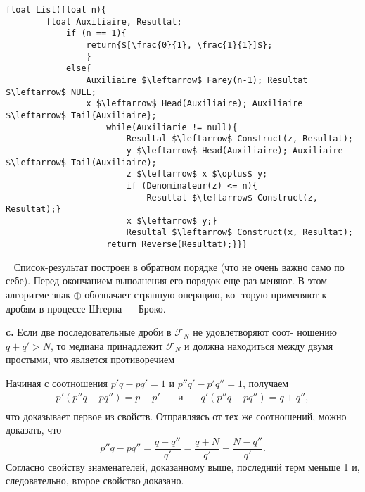 \documentclass{mai_book}
\begin{document}
\begin{lstlisting}[mathescape = true, caption = {Прохождение ряда Фарея}]
	float List(float n){
		float Auxiliaire, Resultat;
			if (n == 1){
				return{$[\frac{0}{1}, \frac{1}{1}]$};
				}
			else{
				Auxiliaire $\leftarrow$ Farey(n-1); Resultat $\leftarrow$ NULL;
				x $\leftarrow$ Head(Auxiliaire); Auxiliaire $\leftarrow$ Tail{Auxiliaire};
					while(Auxiliarie != null){
						Resultal $\leftarrow$ Construct(z, Resultat);
						у $\leftarrow$ Head(Auxiliaire); Auxiliaire $\leftarrow$ Tail(Auxiliaire);
						z $\leftarrow$ x $\oplus$ y;
						if (Denominateur(z) <= n){
							Resultat $\leftarrow$ Construct(z, Resultat);}
						x $\leftarrow$ y;}
						Resultal $\leftarrow$ Construct(x, Resultat);
					return Reverse(Resultat);}}}
			\end{lstlisting}
	\ \newline
\hspace*{15pt} Список-результат построен в обратном порядке (что не очень важно­\linebreak
само по себе). Перед окончанием выполнения его порядок еще раз\linebreak 
меняют. В этом алгоритме знак $\oplus$  обозначает странную операцию, ко-\linebreak
торую применяют к дробям в процессе Штерна — Броко.

\pagebreak

\textbf{c.} Если две последовательные дроби в $\mathcal{F}_N$ не удовлетворяют соот-­\linebreak
ношению $q + q' > N$, то медиана принадлежит $\mathcal{F}_N$ и должна находиться\linebreak
между двумя простыми, что является противоречием

Начиная с соотношения $p'q - pq' = 1$ и $p''q' - p'q'' = 1$,  получаем
		$$\begin{array}{cccc}
				p'(p''q - pq'') = p + p' & \quad\text{и}\quad & q'(p{''}q - pq{''}) = q + q'',\\
		\end{array}$$
что доказывает первое из свойств. Отправляясь от тех же соотношений,\linebreak
можно доказать, что 
$$p''q - pq'' = \frac{q + q''}{q'} = \frac{q + N}{q'} - \frac{N - q''}{q'}.$$
\noindent Согласно свойству знаменателей, доказанному выше, последний терм\linebreak
меньше 1 и, следовательно, второе свойство доказано.
\end{document}
